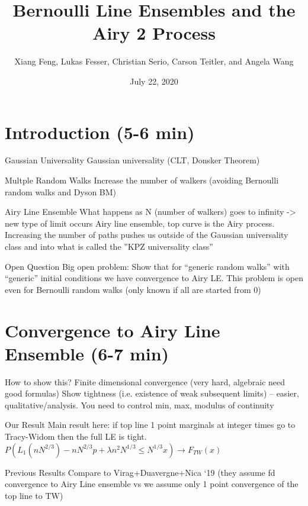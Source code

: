 \documentclass[9pt,t]{beamer}
\title{Bernoulli Line Ensembles and the Airy 2 Process}
\author{Xiang Feng, Lukas Fesser, Christian Serio, Carson Teitler, and Angela Wang}
\institute{Columbia University REU}
\date{July 22, 2020}
\begin{document}
	\begin{frame}
		\maketitle
	\end{frame}
\section{Introduction (5-6 min)}
\begin{frame}{Gaussian Universality}
Gaussian universality (CLT, Donsker Theorem)
\end{frame}
\begin{frame}{Multple Random Walks}
Increase the number of walkers (avoiding Bernoulli random walks and Dyson BM)
\end{frame}
\begin{frame}{Airy Line Ensemble}
What happens as N (number of walkers) goes to infinity -> new type of limit occurs Airy line ensemble, top curve is the Airy process. Increasing the number of paths pushes us outside of the Gaussian universality class and into what is called the ”KPZ universality class”
\end{frame}
\begin{frame}{Open Question}
Big open problem: Show that for “generic random walks” with “generic” initial conditions we have convergence to Airy LE. This problem is open even for Bernoulli random walks (only known if all are started from 0)
\end{frame}

\section{Convergence to Airy Line Ensemble (6-7 min)}
\begin{frame}{How to show this?}
Finite dimensional convergence (very hard, algebraic need good formulas)
Show tightness (i.e. existence of weak subsequent limits) -- easier, qualitative/analysis. You need to control min, max, modulus of continuity
\end{frame}
\begin{frame}{Our Result}
Main result here: if top line 1 point marginals at integer times go to Tracy-Widom then the full LE is tight. 
$P(L_1(nN^{2/3}) - nN^{2/3} p + \lambda n^2 N^{1/3} \leq N^{1/3} x) \to F_{TW}(x)$
\end{frame}
\begin{frame}{Previous Results}
Compare to Virag+Duavergne+Nica ‘19 (they assume fd convergence to Airy Line ensemble vs we assume only 1 point convergence of the top line to TW)
\end{frame}
\end{document}
